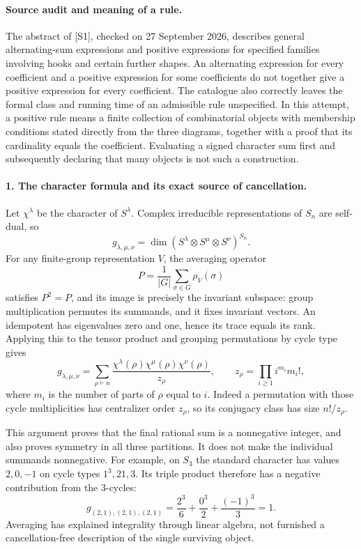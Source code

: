 \documentclass[11pt]{article}
\begin{document}
\paragraph{Source audit and meaning of a rule.}
The abstract of [S1], checked on 27 September 2026, describes general alternating-sum expressions and positive expressions for specified families involving hooks and certain further shapes. An alternating expression for every coefficient and a positive expression for some coefficients do not together give a positive expression for every coefficient. The catalogue also correctly leaves the formal class and running time of an admissible rule unspecified. In this attempt, a positive rule means a finite collection of combinatorial objects with membership conditions stated directly from the three diagrams, together with a proof that its cardinality equals the coefficient. Evaluating a signed character sum first and subsequently declaring that many objects is not such a construction.

\paragraph{1. The character formula and its exact source of cancellation.}
Let $\chi^\lambda$ be the character of $S^\lambda$. Complex irreducible representations of $S_n$ are self-dual, so
\[
 g_{\lambda,\mu,\nu}
 =\dim (S^\lambda\otimes S^\mu\otimes S^\nu)^{S_n}.
\]
For any finite-group representation $V$, the averaging operator
\[
 P=\frac1{|G|}\sum_{\sigma\in G}\rho_V(\sigma)
\]
satisfies $P^2=P$, and its image is precisely the invariant subspace: group multiplication permutes its summands, and it fixes invariant vectors. An idempotent has eigenvalues zero and one, hence its trace equals its rank. Applying this to the tensor product and grouping permutations by cycle type gives
\[
 g_{\lambda,\mu,\nu}
 =\sum_{\rho\vdash n}
   \frac{\chi^\lambda(\rho)\chi^\mu(\rho)\chi^\nu(\rho)}{z_\rho},
 \qquad z_\rho=\prod_{i\ge1}i^{m_i}m_i!,
\]
where $m_i$ is the number of parts of $\rho$ equal to $i$. Indeed a permutation with those cycle multiplicities has centralizer order $z_\rho$, so its conjugacy class has size $n!/z_\rho$.

This argument proves that the final rational sum is a nonnegative integer, and also proves symmetry in all three partitions. It does not make the individual summands nonnegative. For example, on $S_3$ the standard character has values $2,0,-1$ on cycle types $1^3,21,3$. Its triple product therefore has a negative contribution from the 3-cycles:
\[
 g_{(2,1),(2,1),(2,1)}
 =\frac{2^3}{6}+\frac{0^3}{2}+\frac{(-1)^3}{3}=1.
\]
Averaging has explained integrality through linear algebra, not furnished a cancellation-free description of the single surviving object.
\end{document}
